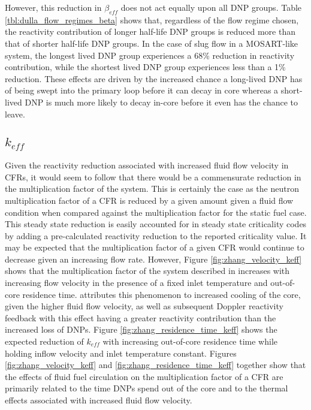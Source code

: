 \documentclass[review]{elsarticle}
\begin{document}
However,
this reduction in $\beta_{eff}$ does not act equally upon all DNP groups. Table
\ref{tbl:dulla_flow_regimes_beta} shows that, regardless of the flow regime chosen,
the reactivity contribution of longer half-life DNP groups is
reduced more than that of shorter half-life DNP groups. In the case of slug
flow in a MOSART-like system, the longest lived DNP group experiences a 68\%
reduction in reactivity contribution, while the shortest lived DNP group
experiences less than a 1\% reduction. These effects are driven by the increased
chance a long-lived DNP has of being swept into the primary loop before it can
decay in core whereas a short-lived DNP is much more likely to decay in-core
before it even has the chance to leave.

\subsection{$k_{eff}$} \label{ssec:keff}
Given the reactivity reduction associated with increased fluid flow
velocity in CFRs, it would seem to follow
that there would be a commensurate reduction in the multiplication factor of
the system. This is certainly the case as the neutron multiplication factor
of a CFR is reduced by a given amount given a fluid flow condition
when compared against the multiplication factor for the static fuel case.
This steady state reduction is easily accounted for in steady state
criticality codes by adding a pre-calculated reactivity
reduction to the reported criticality value. It may be expected
that the multiplication factor of a given CFR would continue to decrease
given an increasing flow rate. 
However, Figure \ref{fig:zhang_velocity_keff} shows that the
multiplication factor of the system described in \cite{zhang_development_2009-1}
increases with increasing flow velocity in the presence of a fixed inlet
temperature and out-of-core
residence time. \cite{zhang_development_2009-1} attributes
this phenomenon to increased cooling of the core, given the higher fluid flow 
velocity, as well as subsequent Doppler reactivity feedback with this effect
having a greater reactivity contribution than the increased loss of DNPs.
Figure \ref{fig:zhang_residence_time_keff} shows 
the expected reduction of $k_{eff}$ with increasing out-of-core residence time
while holding inflow velocity and inlet temperature constant. 
Figures \ref{fig:zhang_velocity_keff} and
\ref{fig:zhang_residence_time_keff} together show that the
effects of fluid fuel circulation on the multiplication factor
of a CFR are primarily related to the time DNPs spend out of
the core and to the thermal effects associated with increased
fluid flow velocity. 
\end{document}
